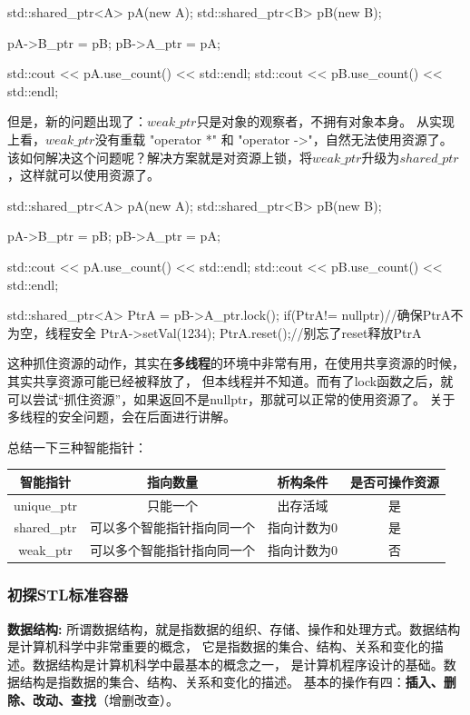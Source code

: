 \begin{tcode}
{
    std::shared_ptr<A> pA(new A);
    std::shared_ptr<B> pB(new B);

    pA->B_ptr = pB;
    pB->A_ptr = pA;

    std::cout << pA.use_count() << std::endl;
    std::cout << pB.use_count() << std::endl;
}
\end{tcode}
但是，新的问题出现了：$weak\_ptr$只是对象的观察者，不拥有对象本身。
从实现上看，$weak\_ptr$没有重载 "operator *" 和 "operator ->"，自然无法使用资源了。
该如何解决这个问题呢？解决方案就是对资源上锁，将$weak\_ptr$升级为$shared\_ptr$，这样就可以使用资源了。

\begin{tcode}
{
    std::shared_ptr<A> pA(new A);
    std::shared_ptr<B> pB(new B);

    pA->B_ptr = pB;
    pB->A_ptr = pA;

    std::cout << pA.use_count() << std::endl;
    std::cout << pB.use_count() << std::endl;

    std::shared_ptr<A> PtrA = pB->A_ptr.lock();
    if(PtrA!= nullptr)//确保PtrA不为空，线程安全
        PtrA->setVal(1234);
    PtrA.reset();//别忘了reset释放PtrA
}
\end{tcode}
这种抓住资源的动作，其实在\textbf{多线程}的环境中非常有用，在使用共享资源的时候，其实共享资源可能已经被释放了，
但本线程并不知道。而有了lock函数之后，就可以尝试“抓住资源”，如果返回不是nullptr，那就可以正常的使用资源了。
关于多线程的安全问题，会在后面进行讲解。

总结一下三种智能指针：
\begin{center}

    \begin{tabular}{cccc}
        \hline
        智能指针 & 指向数量 & 析构条件 & 是否可操作资源\\
        \hline
        unique\_ptr & 只能一个 & 出存活域 & 是\\
        shared\_ptr & 可以多个智能指针指向同一个 & 指向计数为0 & 是\\
        weak\_ptr & 可以多个智能指针指向同一个 & 指向计数为0 & 否\\
        \hline
        
    \end{tabular}
\end{center}

\subsubsection{初探STL标准容器}
\textbf{数据结构:}
所谓数据结构，就是指数据的组织、存储、操作和处理方式。数据结构是计算机科学中非常重要的概念，
它是指数据的集合、结构、关系和变化的描述。数据结构是计算机科学中最基本的概念之一，
是计算机程序设计的基础。数据结构是指数据的集合、结构、关系和变化的描述。
基本的操作有四：\textbf{插入、删除、改动、查找}（增删改查）。


